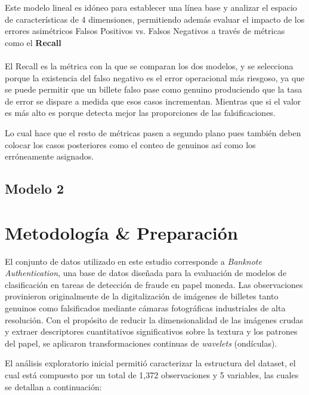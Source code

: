 \documentclass[conference]{IEEEtran}
\begin{document}
	Este modelo lineal es idóneo para establecer una línea base y analizar el espacio de características de 4 dimensiones, permitiendo además evaluar el impacto de los errores asimétricos Falsos Positivos vs. Falsos Negativos a través de métricas como el \textbf{Recall}
	\\	\\	
	El Recall es la métrica con la que se comparan los dos modelos, y se selecciona porque la existencia del falso negativo es el error operacional más riesgoso, ya que se puede permitir que un billete falso pase como genuino produciendo que la tasa de error se dispare a medida que esos casos incrementan. Mientras que si el valor es más alto es porque detecta mejor las proporciones de las falsificaciones. 
	
	Lo cual hace que el resto de métricas pasen a segundo plano pues también deben colocar los casos posteriores como el conteo de genuinos así como los erróneamente asignados.
	
	\subsection{Modelo 2}
	
	\section{Metodología & Preparación}
	El conjunto de datos utilizado en este estudio corresponde a \textit{Banknote Authentication}, una base de datos diseñada para la evaluación de modelos de clasificación en tareas de detección de fraude en papel moneda. Las observaciones provinieron originalmente de la digitalización de imágenes de billetes tanto genuinos como falsificados mediante cámaras fotográficas industriales de alta resolución. Con el propósito de reducir la dimensionalidad de las imágenes crudas y extraer descriptores cuantitativos significativos sobre la textura y los patrones del papel, se aplicaron transformaciones continuas de \textit{wavelets} (ondículas).
	
	El análisis exploratorio inicial permitió caracterizar la estructura del dataset, el cual está compuesto por un total de 1,372 observaciones y 5 variables, las cuales se detallan a continuación:
	
\end{document}
